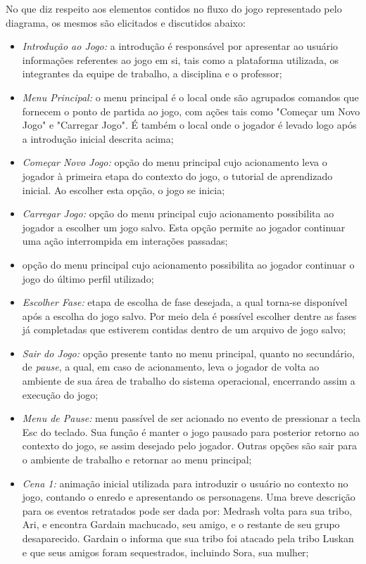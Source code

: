 No que diz respeito aos elementos contidos no fluxo do jogo representado pelo diagrama, os mesmos são elicitados e discutidos abaixo:
\begin{itemize}
\item \textit{Introdução ao Jogo:} a introdução é responsável por apresentar ao usuário informações referentes ao jogo em si, tais como a plataforma utilizada, os integrantes da equipe de trabalho, a disciplina e o professor;
\item \textit{Menu Principal:} o menu principal é o local onde são agrupados comandos que fornecem o ponto de partida ao jogo, com ações tais como "Começar um Novo Jogo" e "Carregar Jogo". É também o local onde o jogador é levado logo após a introdução inicial descrita acima;
\item \textit{Começar Novo Jogo:} opção do menu principal cujo acionamento leva o jogador à primeira etapa do contexto do jogo, o tutorial de aprendizado inicial. Ao escolher esta opção, o jogo se inicia;
\item \textit{Carregar Jogo:} opção do menu principal cujo acionamento possibilita ao jogador a escolher um jogo salvo. Esta opção permite ao jogador continuar uma ação interrompida em interações passadas;
\item {} opção do menu principal cujo acionamento possibilita ao jogador continuar o jogo do último perfil utilizado;
\item \textit{Escolher Fase:} etapa de escolha de fase desejada, a qual torna-se disponível após a escolha do jogo salvo. Por meio dela é possível escolher dentre as fases já completadas que estiverem contidas dentro de um arquivo de jogo salvo;
\item \textit{Sair do Jogo:} opção presente tanto no menu principal, quanto no secundário, de \textit{pause}, a qual, em caso de acionamento, leva o jogador de volta ao ambiente de sua área de trabalho do sistema operacional, encerrando assim a execução do jogo;
\item \textit{Menu de Pause:} menu passível de ser acionado no evento de pressionar a tecla Esc do teclado. Sua função é manter o jogo pausado para posterior retorno ao contexto do jogo, se assim desejado pelo jogador. Outras opções são sair para o ambiente de trabalho e retornar ao menu principal;
\item \textit{Cena 1:} animação inicial utilizada para introduzir o usuário no contexto no jogo, contando o enredo e apresentando os personagens. Uma breve descrição para os eventos retratados pode ser dada por: Medrash volta para sua tribo, Ari, e encontra Gardain machucado, seu amigo, e o restante de seu grupo desaparecido. Gardain o informa que sua tribo foi atacado pela tribo Luskan e que seus amigos foram sequestrados, incluindo Sora, sua mulher;

\end{itemize}
